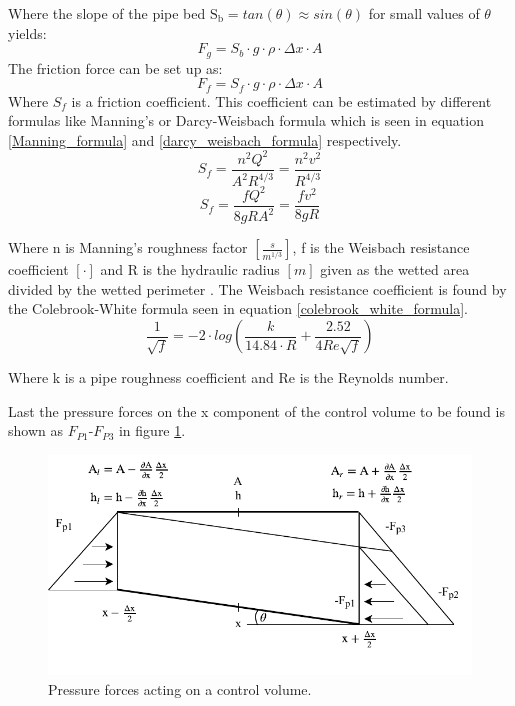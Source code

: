 Where the slope of the pipe bed $\text{S}_\text{b} = tan(\theta) \approx sin(\theta)$ for small values of $\theta$ yields:
\begin{equation}
F_g = S_b \cdot g \cdot \rho \cdot \Delta x \cdot A 
\end{equation}
The friction force can be set up as:
\begin{equation}
F_f = S_f \cdot g \cdot \rho \cdot \Delta x \cdot A 
\label{friction_force} 
\end{equation}
Where $S_f$ is a friction coefficient. This coefficient can be estimated by different formulas like Manning's or Darcy-Weisbach formula which is seen in equation \ref{Manning_formula} and \ref{darcy_weisbach_formula} respectively. 
\begin{equation}
	S_f = \frac{n^2 Q^2}{A^2R^{4/3}}= \frac{n^2 v^2}{R^{4/3}}
\label{Manning_formula}
\end{equation}
\begin{equation}
	S_f = \frac{f Q^2}{8gR A^2}= \frac{f v^2}{8gR}
\label{darcy_weisbach_formula}
\end{equation}

Where n is Manning's roughness factor $[ \frac{s}{m^{1/3}} ]$, f is the Weisbach resistance coefficient $[\cdot]$ and R is the hydraulic radius $[m]$ given as the wetted area divided by the wetted perimeter \cite{stormwatercollectionsystems}.
The Weisbach resistance coefficient is found by the Colebrook-White formula seen in equation \ref{colebrook_white_formula}.
\begin{equation}
\frac{1}{\sqrt{f}} = -2\cdot log \left( \frac{k}{14.84 \cdot R}+ \frac{2.52}{4 Re \sqrt{f}} \right)
\label{colebrook_white_formula}
\end{equation}

Where k is a pipe roughness coefficient and Re is the Reynolds number.

Last the pressure forces on the x component of the control volume to be found is shown as $F_{P1}$-$F_{P3}$ in figure \ref{fig:forces_on_CV}. 

\begin{figure}[H]
\centering
\includegraphics[width=1\textwidth]{report/modeling/pictures/Pressure_forces}
\caption{Pressure forces acting on a control volume. }
\label{fig:forces_on_CV}
\end{figure}

